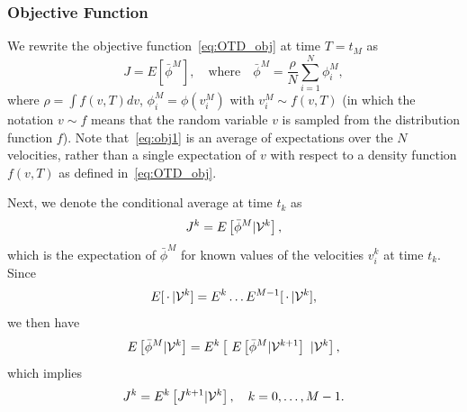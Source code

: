 \documentclass[12pt,nopreprintline]{elsarticle}
\begin{document}


\subsubsection{Objective Function}%

We rewrite the objective function~\eqref{eq:OTD_obj} at time $T= t_M$ as
\begin{equation} \label{eq:obj1}
J = E\left[ \bar{\phi}^M \right],\quad \text{where} \quad 
\bar{\phi}^M = \frac{\rho}{N}\sum_{i=1}^{N} \phi_i^M,
\end{equation}
where $\rho = \int f(v,T) dv$, $\phi_i^M=\phi(v_i^M)$ with $v_i^M \sim f(v,T)$ (in which the notation  $v \sim f$ means that the random variable  $v$ is sampled from the distribution function $f$).
Note that~\eqref{eq:obj1} is an average of expectations over the $N$ velocities, rather than a single expectation of $v$ with respect to a density function $f(v, T)$ as defined in~\eqref{eq:OTD_obj}. %

Next, we denote the conditional average at time $t_k$ as 
\begin{equation} \label{eq:Jk}
J^k = E\left[ \bar{\phi}^M | {\cal V}^k\right],
\end{equation}
which is the expectation of $\bar{\phi}^M$ for known values of the velocities $v_i^k$ at time $t_k$. 
Since
\begin{equation*}
E[\,\cdot\, | {\cal V}^k] = E^k  \ldots E^{M-1}[\,\cdot\,  | {\cal V}^k], %
\end{equation*}
we then have
\begin{equation*}
E\left[ \bar{\phi}^M | {\cal V}^k \right] = E^k \left[ \ E\left[ \bar{\phi}^M | {\cal V}^{k+1} \right] \ | {\cal V}^k \right],  %
\end{equation*}
which implies
\begin{equation} \label{iteratedJ}
J^k = E^k\left[ J^{k+1} | {\cal V}^k \right],\quad k =0,\ldots, M-1.
\end{equation}
\end{document}
